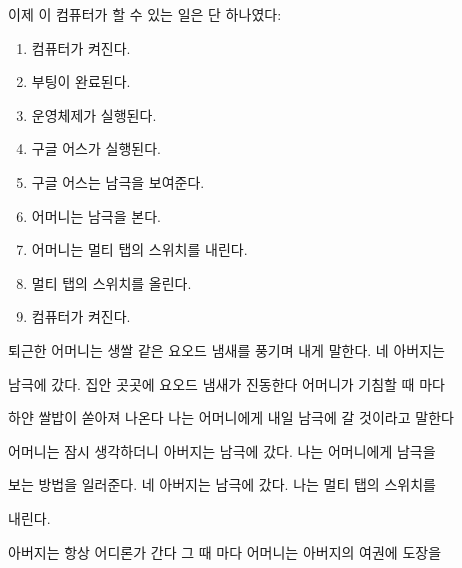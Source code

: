 이제 이 컴퓨터가 할 수 있는 일은 단 하나였다:



\begin{enumerate}

\def\labelenumi{\arabic{enumi}.}

\tightlist

\item

  컴퓨터가 켜진다.

\item

  부팅이 완료된다.

\item

  운영체제가 실행된다.

\item

  구글 어스가 실행된다.

\item

  구글 어스는 남극을 보여준다.

\item

  어머니는 남극을 본다.

\item

  어머니는 멀티 탭의 스위치를 내린다.

\item

  멀티 탭의 스위치를 올린다.

\item

  컴퓨터가 켜진다.

\end{enumerate}



퇴근한 어머니는 생쌀 같은 요오드 냄새를 풍기며 내게 말한다. 네 아버지는

남극에 갔다. 집안 곳곳에 요오드 냄새가 진동한다 어머니가 기침할 때 마다

하얀 쌀밥이 쏟아져 나온다 나는 어머니에게 내일 남극에 갈 것이라고 말한다

어머니는 잠시 생각하더니 아버지는 남극에 갔다. 나는 어머니에게 남극을

보는 방법을 일러준다. 네 아버지는 남극에 갔다. 나는 멀티 탭의 스위치를

내린다.



아버지는 항상 어디론가 간다 그 때 마다 어머니는 아버지의 여권에 도장을

